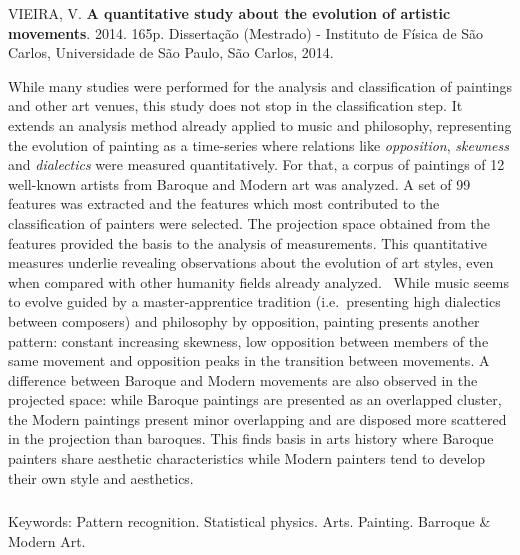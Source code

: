 \afterpage{\blankpage}

\begin{abstract2}
\vspace{-10mm}
VIEIRA, V. \textbf{A quantitative study about the evolution of artistic movements}. 2014. 165p. Dissertação (Mestrado) - Instituto de Física de São Carlos, Universidade de São Paulo, São Carlos, 2014.
\vspace{15mm}

  While many studies were performed for the analysis and
  classification of paintings and other art venues, this study does
  not stop in the classification step. It extends an analysis method
  already applied to music and philosophy, representing the evolution
  of painting as a time-series where relations like
  \textit{opposition}, \textit{skewness} and \textit{dialectics} were
  measured quantitatively. For that, a corpus of paintings of 12
  well-known artists from Baroque and Modern art was analyzed. A set
  of 99 features was extracted and the features which most contributed
  to the classification of painters were selected. The projection
  space obtained from the features provided the basis to the analysis
  of measurements. This quantitative measures underlie revealing
  observations about the evolution of art styles, even when compared
  with other humanity fields already analyzed.~\cite{vieira} While
  music seems to evolve guided by a master-apprentice tradition
  (i.e.\ presenting high dialectics between composers) and philosophy
  by opposition, painting presents another pattern: constant
  increasing skewness, low opposition between members of the same
  movement and opposition peaks in the transition between movements. A
  difference between Baroque and Modern movements are also observed in
  the projected space: while Baroque paintings are presented as an
  overlapped cluster, the Modern paintings present minor overlapping
  and are disposed more scattered in the projection than
  baroques. This finds basis in arts history where Baroque painters
  share aesthetic characteristics while Modern painters tend to
  develop their own style and aesthetics.

$\phantom{linha em branco}$\\
Keywords: Pattern recognition. Statistical physics. Arts. Painting. Barroque \& Modern Art.

\end{abstract2}
